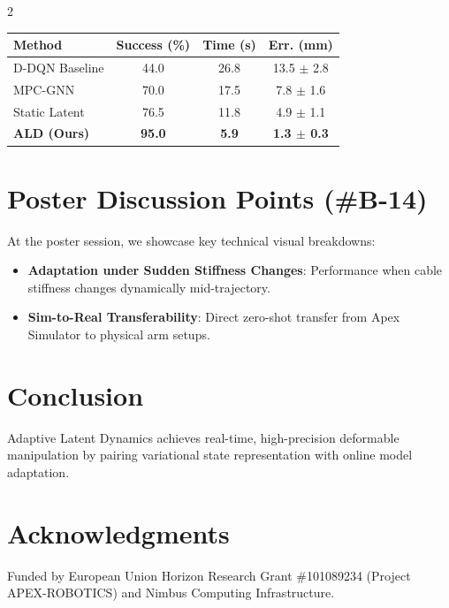 \documentclass[10pt, a4paper]{scrartcl}
\begin{document}
\begin{multicols}{2}
\begin{center}
  \begin{tcolorbox}[
    colback=lightbg,
    colframe=boxborder,
    arc=2mm,
    boxrule=0.6pt,
    left=4pt, right=4pt, top=4pt, bottom=4pt
  ]
    \label{tab:results}
    \vspace{-2pt}
    \small
    \begin{tabularx}{\linewidth}{X c c c}
      \toprule
      \textbf{Method} & \textbf{Success (\%)} & \textbf{Time (s)} & \textbf{Err. (mm)} \\
      \midrule
      D-DQN Baseline   & 44.0 & 26.8 & 13.5 $\pm$ 2.8 \\
      MPC-GNN          & 70.0 & 17.5 & 7.8 $\pm$ 1.6 \\
      Static Latent    & 76.5 & 11.8 & 4.9 $\pm$ 1.1 \\
      \rowcolor{accentbg}
      \textbf{ALD (Ours)} & \textbf{95.0} & \textbf{5.9} & \textbf{1.3 $\pm$ 0.3} \\
      \bottomrule
    \end{tabularx}
  \end{tcolorbox}
\end{center}

\section{Poster Discussion Points (\#B-14)}
At the poster session, we showcase key technical visual breakdowns:
\begin{itemize}[leftmargin=12pt, itemsep=2pt]
  \item \textbf{Adaptation under Sudden Stiffness Changes}: Performance when cable stiffness changes dynamically mid-trajectory.
  \item \textbf{Sim-to-Real Transferability}: Direct zero-shot transfer from Apex Simulator to physical arm setups.
\end{itemize}

\section{Conclusion}
Adaptive Latent Dynamics achieves real-time, high-precision deformable manipulation by pairing variational state representation with online model adaptation.

\section*{Acknowledgments}
Funded by European Union Horizon Research Grant \#101089234 (Project APEX-ROBOTICS) and Nimbus Computing Infrastructure.


\end{multicols}
\end{document}
